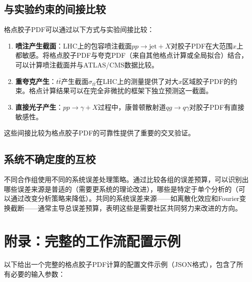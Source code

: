 \documentclass[11pt,a4paper]{ctexart}
\begin{document}
\subsection{与实验约束的间接比较}

格点胶子PDF可以通过以下方式与实验间接比较：

\begin{enumerate}
  \item \textbf{喷注产生截面}：LHC上的包容喷注截面$pp \to \text{jet} + X$对胶子PDF在大范围$x$上都敏感。将格点胶子PDF与夸克PDF（来自其他格点计算或全局拟合）结合，可以计算喷注截面并与ATLAS/CMS数据比较。
  
  \item \textbf{重夸克产生}：$t\bar{t}$产生截面$\sigma_{t\bar{t}}$在LHC上的测量提供了对大$x$区域胶子PDF的约束。格点计算结果可以在完全非微扰的框架下独立预测这一截面。
  
  \item \textbf{直接光子产生}：$pp \to \gamma + X$过程中，康普顿散射道$qg \to q\gamma$对胶子PDF有直接敏感性。
\end{enumerate}

这些间接比较为格点胶子PDF的可靠性提供了重要的交叉验证。

\subsection{系统不确定度的互校}

不同合作组使用不同的系统误差处理策略。通过比较各组的误差预算，可以识别出哪些误差来源是普适的（需要更系统的理论改进），哪些是特定于单个分析的（可以通过改变分析策略来降低）。共同的系统误差来源——如离散化效应和Fourier变换截断——通常主导总误差预算，表明这些是需要社区共同努力来改进的方向。

\section{附录：完整的工作流配置示例}

以下给出一个完整的格点胶子PDF计算的配置文件示例（JSON格式），包含了所有必要的输入参数：
\end{document}
